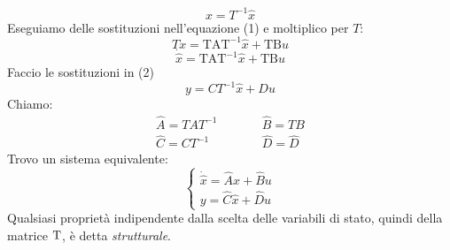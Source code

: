 	\begin{equation*}
		\boxed{x = T^{-1}\hat{x}}
	\end{equation*}
	Eseguiamo delle sostituzioni nell'equazione (1) e moltiplico per $ T $:
	\[
	T\dot{x} = \text{TAT}^{-1}\hat{x}+\text{TB}u
	\]
	\[
	\boxed{\dot{\hat{x}} = \text{TAT}^{-1}\hat{x}+\text{TB}u}
	\]
	Faccio le sostituzioni in (2)
	\[y = CT^{-1}\hat{x}+ Du\]
	Chiamo:
	\begin{align*}
		\hat{A} = TAT^{-1}& \qquad &\hat{B} = TB\\
		\hat{C} = CT^{-1}& \qquad &\hat{D} = \hat{D}
	\end{align*}
	Trovo un sistema equivalente:
	\begin{equation*}
		\begin{cases}
			\dot{\hat{x}} = \hat{A}\hat{x}+\hat{B}u\\
			y = \hat{C}\hat{x} + \hat{D}u
		\end{cases}
	\end{equation*}
	Qualsiasi proprietà indipendente dalla scelta delle variabili di stato, quindi della matrice $ \text T $, è detta \emph{strutturale}.


